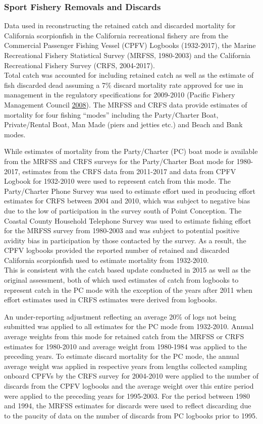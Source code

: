 \documentclass[12pt,]{article}
\begin{document}
\subsubsection{Sport Fishery Removals and
Discards}\label{sport-fishery-removals-and-discards}

Data used in reconstructing the retained catch and discarded mortality
for California scorpionfish in the California recreational fishery are
from the Commercial Passenger Fishing Vessel (CPFV) Logbooks
(1932-2017), the Marine Recreational Fishery Statistical Survey (MRFSS,
1980-2003) and the California Recreational Fishery Survey (CRFS,
2004-2017).\\
Total catch was accounted for including retained catch as well as the
estimate of fish discarded dead assuming a 7\% discard mortality rate
approved for use in management in the regulatory specifications for
2009-2010 (Pacific Fishery Management Council
\protect\hyperlink{ref-PFMC2008}{2008}). The MRFSS and CRFS data provide
estimates of mortality for four fishing ``modes'' including the
Party/Charter Boat, Private/Rental Boat, Man Made (piers and jetties
etc.) and Beach and Bank modes.

While estimates of mortality from the Party/Charter (PC) boat mode is
available from the MRFSS and CRFS surveys for the Party/Charter Boat
mode for 1980-2017, estimates from the CRFS data from 2011-2017 and data
from CPFV Logbook for 1932-2010 were used to represent catch from this
mode. The Party/Charter Phone Survey was used to estimate effort used in
producing effort estimates for CRFS between 2004 and 2010, which was
subject to negative bias due to the low of participation in the survey
south of Point Conception. The Coastal County Household Telephone Survey
was used to estimate fishing effort for the MRFSS survey from 1980-2003
and was subject to potential positive avidity bias in participation by
those contacted by the survey. As a result, the CPFV logbooks provided
the reported number of retained and discarded California scorpionfish
used to estimate mortality from 1932-2010.\\
This is consistent with the catch based update conducted in 2015 as well
as the original assessment, both of which used estimates of catch from
logbooks to represent catch in the PC mode with the exception of the
years after 2011 when effort estimates used in CRFS estimates were
derived from logbooks.

An under-reporting adjustment reflecting an average 20\% of logs not
being submitted was applied to all estimates for the PC mode from
1932-2010. Annual average weights from this mode for retained catch from
the MRFSS or CRFS estimates for 1980-2010 and average weight from
1980-1984 was applied to the preceding years. To estimate discard
mortality for the PC mode, the annual average weight was applied in
respective years from lengths collected sampling onboard CPFVs by the
CRFS survey for 2004-2010 were applied to the number of discards from
the CPFV logbooks and the average weight over this entire period were
applied to the preceding years for 1995-2003. For the period between
1980 and 1994, the MRFSS estimates for discards were used to reflect
discarding due to the paucity of data on the number of discards from PC
logbooks prior to 1995.
\end{document}
